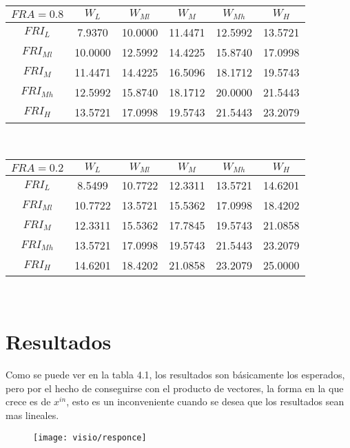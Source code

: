 \begin{table}[h]
    	
    	\begin{tabular}{|c||c|c|c|c|c|}
    		\hline
    		$FRA=0.8$	 &$W_L$&$W_{Ml}$&$W_M$&$W_{Mh}$&$W_H$\\
			\hline  
    		\hline  
    		$FRI_L$&7.9370  & 10.0000 &  11.4471  & 12.5992  & 13.5721\\
    		$FRI_{Ml}$&10.0000 &  12.5992 &  14.4225 &  15.8740 &  17.0998\\
    		$FRI_M$&11.4471 &  14.4225 &  16.5096 &  18.1712 &  19.5743\\
    		$FRI_{Mh}$&12.5992 &  15.8740 &  18.1712 &  20.0000 &  21.5443\\
    		$FRI_H$&13.5721 &  17.0998 &  19.5743 &  21.5443 &  23.2079\\
    		\hline 
    	\end{tabular} 
    	\bigskip
    	\\
    	\pagebreak
    	\begin{tabular}{|c||c|c|c|c|c|}
    		\hline
    		$FRA=0.2$	 &$W_L$&$W_{Ml}$&$W_M$&$W_{Mh}$&$W_H$\\
    		\hline  
    		\hline  
    		$FRI_L$&8.5499  & 10.7722 &  12.3311  & 13.5721 &  14.6201\\
    		$FRI_{Ml}$&10.7722 &  13.5721 &  15.5362 &  17.0998 &  18.4202\\
    		$FRI_M$&12.3311 & 15.5362  & 17.7845  & 19.5743  & 21.0858\\
    		$FRI_{Mh}$&13.5721 &  17.0998 &  19.5743 &  21.5443 &  23.2079\\
    		$FRI_H$&14.6201 &  18.4202 &  21.0858 &  23.2079 &  25.0000\\
    		\hline 
    	\end{tabular} 
    	\bigskip
    	\\
    \end{table}

\section{Resultados}
Como se puede ver en la tabla 4.1, los resultados son básicamente los esperados,  pero por el hecho de conseguirse con el producto de vectores, la forma en la que crece es de $x^{in}$, esto es un inconveniente cuando se desea que los resultados sean mas lineales.


\begin{figure}[h]
	\centering
	\texttt{[image: visio/responce]}
	\caption{}
	\label{fig:responce}
\end{figure}


